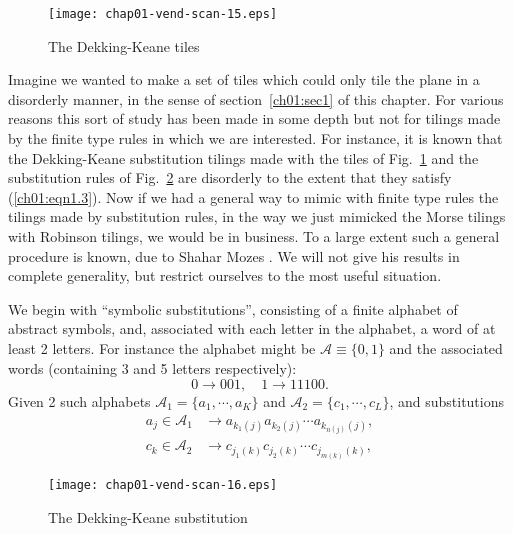 \documentclass[reqno]{stml-l}
\theoremstyle{plain}
\theoremstyle{definition}
\numberwithin{equation}{chapter}
\begin{document}
\begin{figure}[h]
\texttt{[image: chap01-vend-scan-15.eps]}
\caption{The Dekking-Keane tiles}
\label{ch01:fig28}
\end{figure}

Imagine we wanted to make a set of tiles which could only tile the plane in a disorderly manner, in the sense of section~\ref{ch01:sec1} of this chapter. For various reasons this sort of study has been made in some depth but not for tilings made by the finite type rules in which we are interested. For instance, it is known \cite{bib:DeK} that the Dekking-Keane substitution tilings made with the tiles of Fig.~\ref{ch01:fig28} and the substitution rules of Fig.~\ref{ch01:fig29} are disorderly to the extent that they satisfy (\ref{ch01:eqn1.3}). Now if we had a general way to mimic with finite type rules the tilings made by substitution rules, in the way we just mimicked the Morse tilings with Robinson tilings, we would be in business. To a large extent such a general procedure is known, due to Shahar Mozes \cite{bib:Moz}. We will not give his results in complete generality, but restrict ourselves to the most useful situation.

We begin with ``symbolic substitutions'', consisting of a finite alphabet of abstract symbols, and, associated with each letter in the alphabet, a word of at least 2 letters. For instance the alphabet might be $\mathcal{A}\equiv\{0,1\}$ and the associated words (containing 3 and 5 letters respectively):
\begin{equation}\label{ch01:eqn1.20}
0\xrightarrow{\quad} 001,\quad 1 \xrightarrow{\quad} 11100.
\end{equation}
Given 2 such alphabets $\mathcal{A}_{1}=\{a_{1}, \cdots, a_{K}\}$ and $\mathcal{A}_{2}=\{c_{1}, \cdots, c_{L}\}$, and substitutions
\begin{equation}\label{ch01:eqn1.21}
\begin{split}
a_{j}\in \mathcal{A}_{1} & \longrightarrow a_{k_{1}(j)}a_{k_{2}(j)}\cdots a_{k_{n(j)}(j)},\\
c_{k}\in \mathcal{A}_{2}&\longrightarrow c_{j_{1}(k)}c_{j_{2}(k)}\cdots c_{j_{m(k)}(k)},
\end{split}
\end{equation}

\begin{figure}[h]
\texttt{[image: chap01-vend-scan-16.eps]}
\caption{The Dekking-Keane substitution }
\label{ch01:fig29}
\end{figure}
\end{document}

